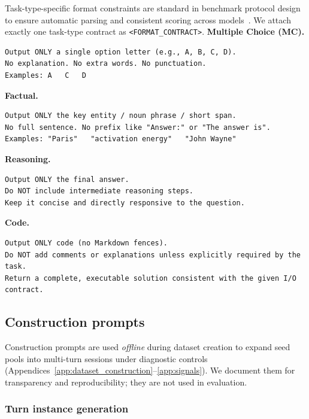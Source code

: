 Task-type-specific format constraints are standard in benchmark protocol design to ensure automatic parsing and consistent scoring across models~\citep{liang2022helm,kiela-etal-2021-dynabench,zhou2024webarena}.
We attach exactly one task-type contract as \texttt{<FORMAT\_CONTRACT>}.
\textbf{Multiple Choice (MC).}
\\
\begin{lstlisting}[frame=single]
Output ONLY a single option letter (e.g., A, B, C, D).
No explanation. No extra words. No punctuation.
Examples: A   C   D
\end{lstlisting}

\textbf{Factual.}
\\
\begin{lstlisting}[frame=single]
Output ONLY the key entity / noun phrase / short span.
No full sentence. No prefix like "Answer:" or "The answer is".
Examples: "Paris"   "activation energy"   "John Wayne"
\end{lstlisting}

\textbf{Reasoning.}
\\
\begin{lstlisting}[frame=single]
Output ONLY the final answer.
Do NOT include intermediate reasoning steps.
Keep it concise and directly responsive to the question.
\end{lstlisting}

\textbf{Code.}
\\
\begin{lstlisting}[frame=single]
Output ONLY code (no Markdown fences).
Do NOT add comments or explanations unless explicitly required by the task.
Return a complete, executable solution consistent with the given I/O contract.
\end{lstlisting}
\subsection{Construction prompts}
\label{app:prompts_construction}

Construction prompts are used \emph{offline} during dataset creation to expand seed pools into multi-turn sessions under diagnostic controls (Appendices~\ref{app:dataset_construction}--\ref{app:signals}).
We document them for transparency and reproducibility; they are not used in evaluation.
\subsubsection{Turn instance generation}
\label{app:prompts_turn_generation}

